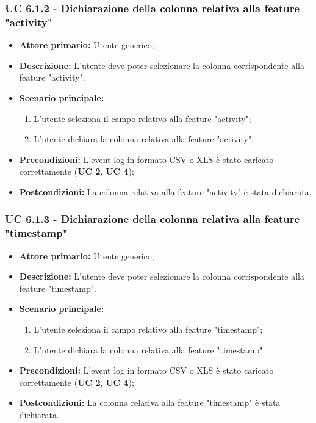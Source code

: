 \subsubsection{UC 6.1.2 - Dichiarazione della colonna relativa alla feature "activity"}
\begin{itemize}
	\item \textbf{Attore primario:} Utente generico;
	\item \textbf{Descrizione:} L'utente deve poter selezionare la colonna corrispondente alla feature "activity".
	\item \textbf{Scenario principale:} 
		\begin{enumerate}
			\item L'utente seleziona il campo relativo alla feature "activity";
			\item L'utente dichiara la colonna relativa alla feature "activity".
		\end{enumerate}
	\item \textbf{Precondizioni:}  L'event log in formato CSV o XLS è stato caricato correttamente (\textbf{UC 2}, \textbf{UC 4});
	\item \textbf{Postcondizioni:} La colonna relativa alla feature "activity" è stata dichiarata.
\end{itemize}

\subsubsection{UC 6.1.3 - Dichiarazione della colonna relativa alla feature "timestamp"}
\begin{itemize}
	\item \textbf{Attore primario:} Utente generico;
	\item \textbf{Descrizione:} L'utente deve poter selezionare la colonna corrispondente alla feature "timestamp".
	\item \textbf{Scenario principale:} 
		\begin{enumerate}
			\item L'utente seleziona il campo relativo alla feature "timestamp";
			\item L'utente dichiara la colonna relativa alla feature "timestamp".
		\end{enumerate}
	\item \textbf{Precondizioni:}  L'event log in formato CSV o XLS è stato caricato correttamente (\textbf{UC 2}, \textbf{UC 4});
	\item \textbf{Postcondizioni:} La colonna relativa alla feature "timestamp" è stata dichiarata.
\end{itemize}

